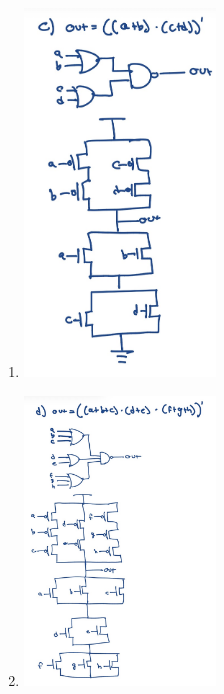\documentclass[11pt]{article}
\begin{document}
\begin{enumerate}[label={\bfseries\alph*)}, itemsep=1em]
    \item 
    \begin{center}
        \includegraphics[width=0.4\textwidth]{question2/2c.jpeg}
    \end{center}

    \item 
    \begin{center}
        \includegraphics[width=0.4\textwidth]{question2/2d.jpeg}
    \end{center}
\end{enumerate}

\clearpage
\end{document}
